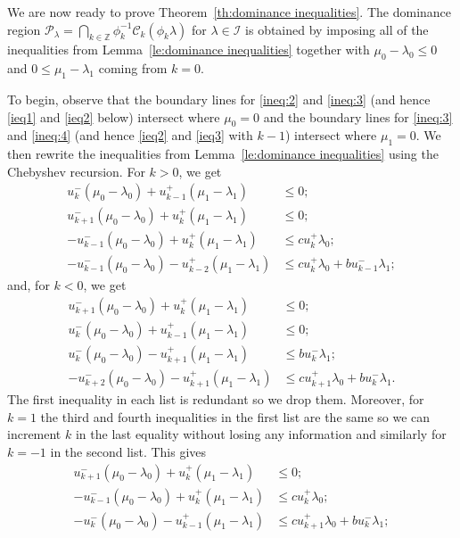 \documentclass{amsart}
\numberwithin{theorem}{section}
\newcommand{\cC}{\mathcal{C}}
\newcommand{\cI}{\mathcal{I}}
\newcommand{\cP}{\mathcal{P}}
\newcommand{\ZZ}{\mathbb{Z}}
\begin{document}
  We are now ready to prove Theorem~\ref{th:dominance inequalities}.
  The dominance region $\cP_\lambda=\bigcap_{k\in\ZZ}\phi_k^{-1}\cC_k(\phi_k\lambda)$ for $\lambda\in\cI$ is obtained by imposing all of the inequalities from Lemma~\ref{le:dominance inequalities} together with $\mu_0 -\lambda_0 \le 0$ and $0 \le \mu_1 - \lambda_1$ coming from $k=0$.

  To begin, observe that the boundary lines for \eqref{ineq:2} and \eqref{ineq:3} (and hence \eqref{ieq1} and \eqref{ieq2} below) intersect where $\mu_0=0$ and the boundary lines for \eqref{ineq:3} and \eqref{ineq:4} (and hence \eqref{ieq2} and \eqref{ieq3} with $k-1$) intersect where $\mu_1=0$.
  We then rewrite the inequalities from Lemma~\ref{le:dominance inequalities} using the Chebyshev recursion.
  For $k>0$, we get
  \begin{align*}
    u_k^-(\mu_0-\lambda_0)+u_{k-1}^+(\mu_1-\lambda_1) &\le 0;\\
    u_{k+1}^-(\mu_0-\lambda_0)+u_k^+(\mu_1-\lambda_1) &\le 0;\\
    -u_{k-1}^-(\mu_0-\lambda_0)+u_k^+(\mu_1-\lambda_1) &\le cu_k^+\lambda_0;\\
    -u_{k-1}^-(\mu_0-\lambda_0)-u_{k-2}^+(\mu_1-\lambda_1) &\le cu_k^+\lambda_0+bu_{k-1}^-\lambda_1;
  \end{align*}
  and, for $k<0$, we get
  \begin{align*}
    u_{k+1}^-(\mu_0-\lambda_0)+u_k^+(\mu_1-\lambda_1) &\le 0;\\
    u_k^-(\mu_0-\lambda_0)+u_{k-1}^+(\mu_1-\lambda_1) &\le 0;\\
    u_k^-(\mu_0-\lambda_0)-u_{k+1}^+(\mu_1-\lambda_1) &\le bu_k^-\lambda_1;\\
    -u_{k+2}^-(\mu_0-\lambda_0)-u_{k+1}^+(\mu_1-\lambda_1) &\le cu_{k+1}^+\lambda_0+bu_k^-\lambda_1.
  \end{align*}
  The first inequality in each list is redundant so we drop them.
  Moreover, for $k=1$ the third and fourth inequalities in the first list are the same so we can increment $k$ in the last equality without losing any information and similarly for $k=-1$ in the second list. 
  This gives
  \begin{align*}
    u_{k+1}^-(\mu_0-\lambda_0)+u_k^+(\mu_1-\lambda_1) &\le 0;\\
    -u_{k-1}^-(\mu_0-\lambda_0)+u_k^+(\mu_1-\lambda_1) &\le cu_k^+\lambda_0;\\
    -u_k^-(\mu_0-\lambda_0)-u_{k-1}^+(\mu_1-\lambda_1) &\le cu_{k+1}^+\lambda_0+bu_k^-\lambda_1;
  \end{align*}
\end{document}
